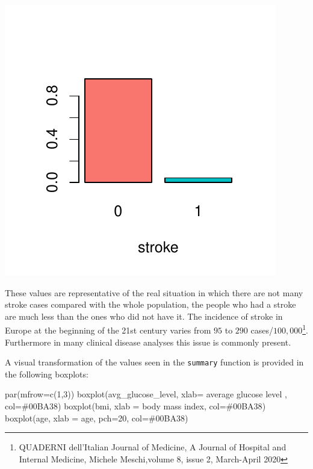 \documentclass[
]{article}
\newenvironment{Shaded}{\begin{snugshade}}{\end{snugshade}}
\newcommand{\AttributeTok}[1]{\textcolor[rgb]{0.77,0.63,0.00}{#1}}
\newcommand{\DecValTok}[1]{\textcolor[rgb]{0.00,0.00,0.81}{#1}}
\newcommand{\FunctionTok}[1]{\textcolor[rgb]{0.00,0.00,0.00}{#1}}
\newcommand{\NormalTok}[1]{#1}
\newcommand{\StringTok}[1]{\textcolor[rgb]{0.31,0.60,0.02}{#1}}
\begin{document}
\begin{center}\includegraphics{stat-project-stroke_files/figure-latex/unnamed-chunk-7-1} \end{center}

These values are representative of the real situation in which there are
not many stroke cases compared with the whole population, the people who had a stroke are much less than the ones who did not have it. The
incidence of stroke in Europe at the beginning of the 21st century
varies from \(95\) to \(290\) cases/\(100,000\)\footnote{QUADERNI
  dell'Italian Journal of Medicine, A Journal of Hospital and Internal
  Medicine, Michele Meschi,volume 8, issue 2, March-April 2020}.
Furthermore in many clinical disease analyses this issue is commonly
present.

A visual transformation of the values seen in the \texttt{summary}
function is provided in the following boxplots:

\begin{Shaded}
\begin{Highlighting}[]
\FunctionTok{par}\NormalTok{(}\AttributeTok{mfrow=}\FunctionTok{c}\NormalTok{(}\DecValTok{1}\NormalTok{,}\DecValTok{3}\NormalTok{))}
\FunctionTok{boxplot}\NormalTok{(avg\_glucose\_level, }\AttributeTok{xlab=} \StringTok{\textquotesingle{}average glucose level\textquotesingle{}}\NormalTok{ , }\AttributeTok{col=}\StringTok{\textquotesingle{}\#00BA38\textquotesingle{}}\NormalTok{)}
\FunctionTok{boxplot}\NormalTok{(bmi, }\AttributeTok{xlab =} \StringTok{\textquotesingle{}body mass index\textquotesingle{}}\NormalTok{, }\AttributeTok{col=}\StringTok{\textquotesingle{}\#00BA38\textquotesingle{}}\NormalTok{)}
\FunctionTok{boxplot}\NormalTok{(age, }\AttributeTok{xlab =} \StringTok{\textquotesingle{}age\textquotesingle{}}\NormalTok{, }\AttributeTok{pch=}\DecValTok{20}\NormalTok{, }\AttributeTok{col=}\StringTok{\textquotesingle{}\#00BA38\textquotesingle{}}\NormalTok{)}
\end{Highlighting}
\end{Shaded}
\end{document}

